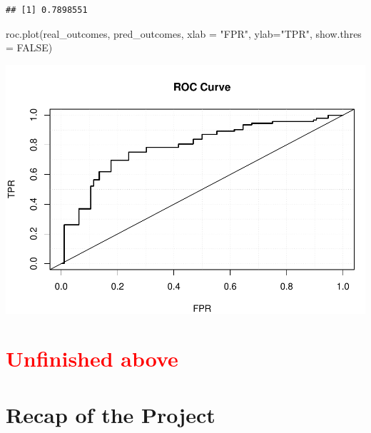 \documentclass[
]{article}
\newenvironment{Shaded}{\begin{snugshade}}{\end{snugshade}}
\newcommand{\AttributeTok}[1]{\textcolor[rgb]{0.77,0.63,0.00}{#1}}
\newcommand{\ConstantTok}[1]{\textcolor[rgb]{0.00,0.00,0.00}{#1}}
\newcommand{\FunctionTok}[1]{\textcolor[rgb]{0.00,0.00,0.00}{#1}}
\newcommand{\NormalTok}[1]{#1}
\newcommand{\SpecialCharTok}[1]{\textcolor[rgb]{0.00,0.00,0.00}{#1}}
\newcommand{\StringTok}[1]{\textcolor[rgb]{0.31,0.60,0.02}{#1}}
\begin{document}
\begin{Shaded}
\end{Shaded}

\begin{verbatim}
## [1] 0.7898551
\end{verbatim}

\begin{Shaded}
\begin{Highlighting}[]
\FunctionTok{roc.plot}\NormalTok{(real\_outcomes, pred\_outcomes, }
         \AttributeTok{xlab =} \StringTok{"FPR"}\NormalTok{, }\AttributeTok{ylab=}\StringTok{"TPR"}\NormalTok{,  }\AttributeTok{show.thres =} \ConstantTok{FALSE}\NormalTok{)}
\end{Highlighting}
\end{Shaded}

\includegraphics{PTT_Analysis_of_Test_Scores_Unfinished_files/figure-latex/draft-roc-auc-with-data-1.pdf}

\section*{\textcolor{red}{Unfinished above}}

\hypertarget{recap}{%
\section{Recap of the Project}\label{recap}}
\end{document}

